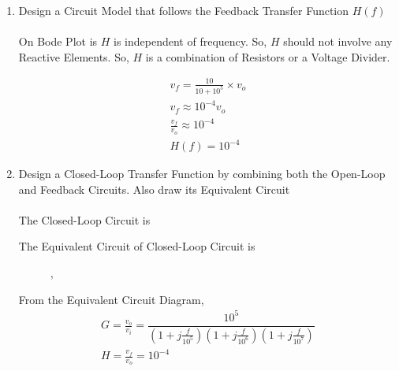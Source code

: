 \begin{enumerate}[label=\thesubsection.\arabic*.,ref=\thesubsection.\theenumi]
\item Design a Circuit Model that follows the Feedback Transfer Function $H(f)$\\
\solution\\
On Bode Plot is $H$ is independent of frequency. So, $H$  should not involve any Reactive Elements. So, $H$ is a combination of Resistors or a Voltage Divider.
\begin{figure}[ht!]
	\begin{center}
		\resizebox{\columnwidth/2}{!}{}
	\end{center}
	\caption{}
	\label{fig:Feedback Circuit}
\end{figure}

\begin{align}
v_{f} = \frac{10}{10 + 10^{5}} \times v_{o}\\
v_{f} \approx 10^{-4} v_{o}\\
\frac{v_{f}}{v_{o}} \approx 10^{-4}\\
H(f) = 10^{-4}
\end{align}

\item  Design a Closed-Loop Transfer Function by combining both the Open-Loop and Feedback Circuits. Also draw its Equivalent Circuit\\
\solution\\
The Closed-Loop Circuit is
\begin{figure}[ht!]
	\begin{center}
		\resizebox{\columnwidth}{!}{}
	\end{center}
	\caption{}
	\label{fig:Closed-Loop Circuit}
\end{figure}

The Equivalent Circuit of Closed-Loop Circuit is
\begin{figure}[ht!]
	\begin{center}
		\resizebox{\columnwidth}{!}{}
	\end{center},
	\caption{}
	\label{fig:Closed-Loop Equivalent Circuit}
\end{figure}

From the Equivalent Circuit Diagram,
\begin{align}
G = \frac{v_{o}}{v_{i}} = \dfrac{10^5}{\left(1+j\frac{f}{10^{5}}\right)\left(1+j\frac{f}{10^{6}}\right)\left(1+j\frac{f}{10^{7}}\right)}\\
H = \frac{v_{f}}{v_{o}} = 10^{-4}
\end{align}


\end{enumerate}
